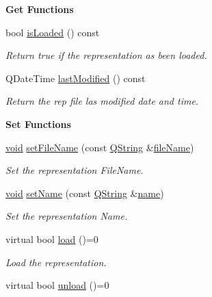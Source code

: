 \begin{Indent}{\bf Get Functions}
\begin{DoxyCompactItemize}
bool \hyperlink{class_g_l_c___rep_acb4c8b550acbcd70b810f34239b95631}{is\-Loaded} () const 
\begin{DoxyCompactList}\small\item\em Return true if the representation as been loaded. \end{DoxyCompactList}\item 
Q\-Date\-Time \hyperlink{class_g_l_c___rep_adddea4b6a394eed14879a4a14fbbabd4}{last\-Modified} () const 
\begin{DoxyCompactList}\small\item\em Return the rep file las modified date and time. \end{DoxyCompactList}\end{DoxyCompactItemize}
\end{Indent}
\begin{Indent}{\bf Set Functions}\par
\begin{DoxyCompactItemize}
\item 
\hyperlink{group___u_a_v_objects_plugin_ga444cf2ff3f0ecbe028adce838d373f5c}{void} \hyperlink{class_g_l_c___rep_a40c9cdfb28a02da9c6f6bdf14ea42269}{set\-File\-Name} (const \hyperlink{group___u_a_v_objects_plugin_gab9d252f49c333c94a72f97ce3105a32d}{Q\-String} \&\hyperlink{class_g_l_c___rep_a05c611f5f34a146a3d41449fb290afeb}{file\-Name})
\begin{DoxyCompactList}\small\item\em Set the representation File\-Name. \end{DoxyCompactList}\item 
\hyperlink{group___u_a_v_objects_plugin_ga444cf2ff3f0ecbe028adce838d373f5c}{void} \hyperlink{class_g_l_c___rep_a50a179e9df6fd53e4776bb547e09c8fa}{set\-Name} (const \hyperlink{group___u_a_v_objects_plugin_gab9d252f49c333c94a72f97ce3105a32d}{Q\-String} \&\hyperlink{glext_8h_ad977737dfc9a274a62741b9500c49a32}{name})
\begin{DoxyCompactList}\small\item\em Set the representation Name. \end{DoxyCompactList}\item 
virtual bool \hyperlink{class_g_l_c___rep_a1fc85fe0955fa94cd655a6484a6fa0b8}{load} ()=0
\begin{DoxyCompactList}\small\item\em Load the representation. \end{DoxyCompactList}\item 
virtual bool \hyperlink{class_g_l_c___rep_aebf9bddb310b7dff26e2691f0219f937}{unload} ()=0

\end{DoxyCompactItemize}
\end{Indent}
